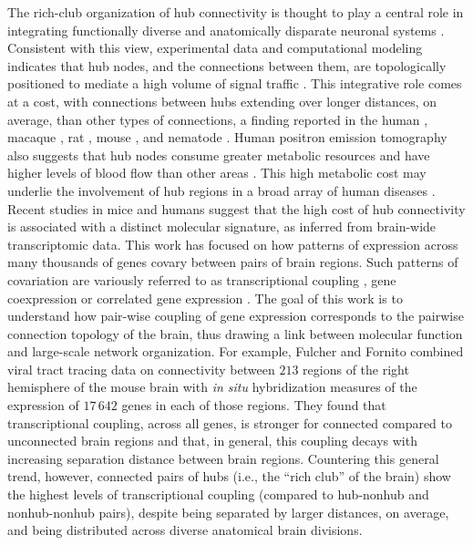 The rich-club organization of hub connectivity is thought to play a central role in integrating functionally diverse and anatomically disparate neuronal systems \citep{Fornito2015,VandenHeuvel2013a,Zamora-Lopez2010, Crossley2014,Crossley2013}. Consistent with this view, experimental data and computational modeling indicates that hub nodes, and the connections between them, are topologically positioned to mediate a high volume of signal traffic \citep{VandenHeuvel2012, Harriger2012, Misic2014, Misic2015a}.
This integrative role comes at a cost, with connections between hubs extending over longer distances, on average, than other types of connections, a finding reported in the human \citep{VandenHeuvel2012}, macaque \citep{Harriger2012}, rat \citep{VandenHeuvel2016b}, mouse \citep{Fulcher2016}, and nematode \citep{Towlson2013}.
Human positron emission tomography also suggests that hub nodes consume greater metabolic resources and have higher levels of blood flow than other areas \citep{Tomasi2013, Collin2014, Liang2013a}.
This high metabolic cost may underlie the involvement of hub regions in a broad array of human diseases \citep{Fornito2015, Bullmore2012, Crossley2014}. \\
Recent studies in mice and humans suggest that the high cost of hub connectivity is associated with a distinct
molecular signature, as inferred from brain-wide transcriptomic data.
This work has focused on how patterns of expression across many thousands of genes covary between pairs of brain regions.
Such patterns of covariation are variously referred to as transcriptional coupling \citep{Fulcher2016}, gene coexpression \citep{Krienen2016} or correlated gene expression \citep{Richiardi2015, Mills2018, Goel2014}.
The goal of this work is to understand how pair-wise coupling of gene expression corresponds to the pairwise connection topology of the brain, thus drawing a link between molecular function and large-scale network organization.
For example, Fulcher and Fornito \citep{Fulcher2016} combined viral tract tracing data on connectivity between $213$ regions of the right hemisphere of the mouse brain \citep{Oh2014} with \emph{in situ} hybridization measures of the expression of $17\,642$ genes in each of those regions.
They found that transcriptional coupling, across all genes, is stronger for connected compared to unconnected brain regions and that, in general, this coupling decays with increasing separation distance between brain regions.
Countering this general trend, however, connected pairs of hubs (i.e., the ``rich club'' of the brain) show the highest levels of transcriptional coupling (compared to hub-nonhub and nonhub-nonhub pairs), despite being separated by larger distances, on average, and being distributed across diverse anatomical brain divisions.
